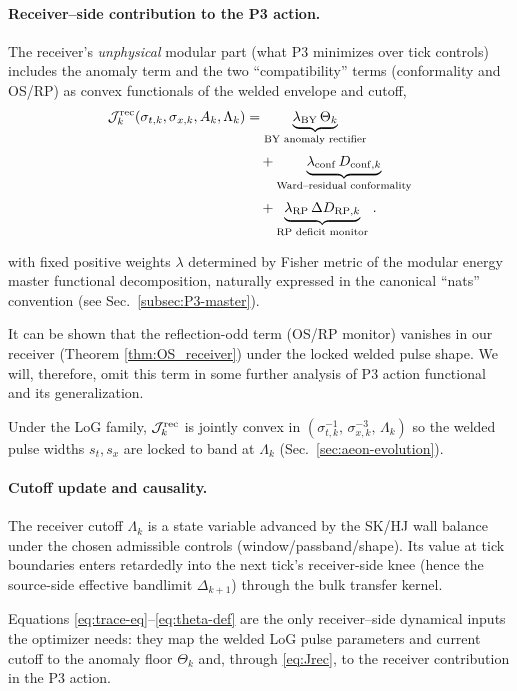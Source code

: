 \documentclass[10pt]{article}
\theoremstyle{definition}
\theoremstyle{plain}
\begin{document}
\paragraph{Receiver–side contribution to the P3 action.}\label{par:uom-main-048}
The receiver’s \emph{unphysical} modular part (what P3 minimizes over tick controls) includes
the anomaly term and the two “compatibility” terms (conformality and OS/RP) as convex functionals
of the welded envelope and cutoff,
\begin{equation}
\label{eq:Jrec}
\begin{aligned}
\mathcal J^{\rm rec}_k(\sigma_{t,k},\sigma_{x,k},A_k,\Lambda_k)
&= \underbrace{\lambda_{\rm BY}\,\Theta_k}_{\text{BY anomaly rectifier}}
\\[2pt]
&\quad + \underbrace{\lambda_{\rm conf}\,D_{{\rm conf},k}}_{\text{Ward--residual conformality}}
\\[2pt]
&\quad + \underbrace{\lambda_{\rm RP}\,\Delta D_{{\rm RP},k}}_{\text{RP deficit monitor}}\,.
\end{aligned}
\end{equation}

with fixed positive weights $\lambda$ determined by Fisher metric of the modular energy master functional decomposition, naturally expressed in the canonical “nats” convention (see Sec.~\ref{subsec:P3-master}). 

It can be shown that the reflection-odd term (OS/RP monitor) vanishes in our receiver (Theorem \ref{thm:OS_receiver}) under the locked welded pulse shape. We will, therefore, omit this term in some further analysis of P3 action functional and its generalization.

Under the LoG family,
$\mathcal J^{\rm rec}_k$ is jointly convex in  $(\sigma_{t,k}^{-1},\,\sigma_{x,k}^{-3},\,\Lambda_k)$ so the welded pulse widths $s_t,s_x$ are locked to band at $\Lambda_k$ (Sec.~\ref{sec:aeon-evolution}).

\paragraph{Cutoff update and causality.}\label{par:uom-main-049}
The receiver cutoff $\Lambda_k$ is a state variable advanced by the SK/HJ wall balance under the
chosen admissible controls (window/passband/shape). Its value at tick boundaries enters retardedly
into the next tick's receiver-side knee (hence the source-side effective bandlimit $\Delta_{k+1}$)
through the bulk transfer kernel.

\medskip
\noindent
Equations \eqref{eq:trace-eq}–\eqref{eq:theta-def} are the only receiver–side dynamical inputs
the optimizer needs: they map the welded LoG pulse parameters and current cutoff to the anomaly
floor $\Theta_k$ and, through \eqref{eq:Jrec}, to the receiver contribution in the P3 action.
\end{document}
